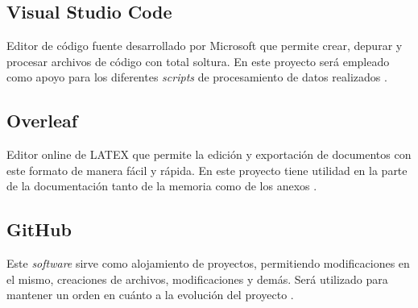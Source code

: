 \subsection{Visual Studio Code}
Editor de código fuente desarrollado por Microsoft que permite crear, depurar y procesar archivos de código con total soltura. En este proyecto será empleado como apoyo para los diferentes \textit{scripts} de procesamiento de datos realizados \cite{code}.

\subsection{Overleaf}
Editor online de LATEX que permite la edición y exportación de documentos con este formato de manera fácil y rápida. En este proyecto tiene utilidad en la parte de la documentación tanto de la memoria como de los anexos \cite{overleaf}.

\subsection{GitHub}
Este \textit{software} sirve como alojamiento de proyectos, permitiendo modificaciones en el mismo, creaciones de archivos, modificaciones y demás. Será utilizado para mantener un orden en cuánto a la evolución del proyecto \cite{github}.
